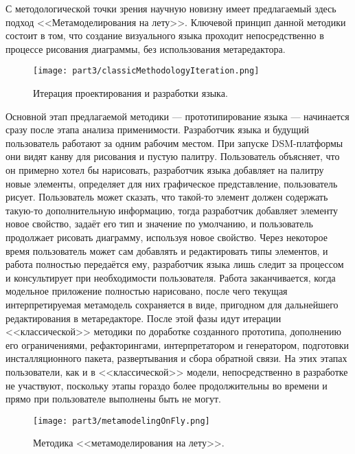 С методологической точки зрения научную новизну имеет предлагаемый здесь подход 
<<Метамоделирования на лету>>. Ключевой принцип данной методики состоит в том, 
что создание визуального языка проходит непосредственно в процессе рисования диаграммы, 
без использования метаредактора.

\begin{figure} [ht]
	\begin{center}
		\texttt{[image: part3/classicMethodologyIteration.png]}
		\caption{Итерация проектирования и разработки языка.}
		\label{classicMethodologyIteration}
	\end{center}
\end{figure}

Основной этап предлагаемой методики --- прототипирование языка --- начинается сразу 
после этапа анализа применимости. Разработчик языка и будущий пользователь работают 
за одним рабочим местом. При запуске DSM-платформы они видят канву для рисования и 
пустую палитру. Пользователь объясняет, что он примерно хотел бы нарисовать, разработчик 
языка добавляет на палитру новые элементы, определяет для них графическое представление, 
пользователь рисует. Пользователь может сказать, что такой-то элемент должен содержать 
такую-то дополнительную информацию, тогда разработчик добавляет элементу новое свойство, 
задаёт его тип и значение по умолчанию, и пользователь продолжает рисовать диаграмму, 
используя новое свойство. Через некоторое время пользователь может сам добавлять и 
редактировать типы элементов, и работа полностью передаётся ему, разработчик языка 
лишь следит за процессом и консультирует при необходимости пользователя. Работа заканчивается, 
когда модельное приложение полностью нарисовано, после чего текущая интерпретируемая 
метамодель сохраняется в виде, пригодном для дальнейшего редактирования в метаредакторе. 
После этой фазы идут итерации <<классической>> методики по доработке созданного 
прототипа, дополнению его ограничениями, рефакторингами, интерпретатором и генератором, 
подготовки инсталляционного пакета, развертывания и сбора обратной связи. На этих этапах 
пользователи, как и в <<классической>> модели, непосредственно в разработке не участвуют, 
поскольку этапы гораздо более продолжительны во времени и прямо при пользователе выполнены 
быть не могут.

\begin{wrapfigure}{R}{0.35\textwidth}
	\begin{center}
		\texttt{[image: part3/metamodelingOnFly.png]}
		\caption{Методика <<метамоделирования на лету>>.}
		\label{metamodelingOnFly}
	\end{center}
\end{wrapfigure}

